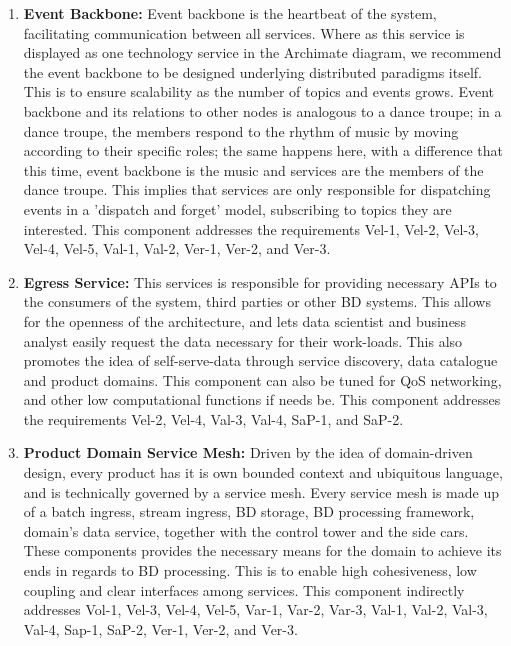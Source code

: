 \documentclass[conference]{IEEEtran}
\begin{document}
\begin{enumerate}
    \item \textbf{Event Backbone:} Event backbone is the heartbeat of the system, facilitating communication between all services. Where as this service is displayed as one technology service in the Archimate diagram, we recommend the event backbone to be designed underlying distributed paradigms itself. This is to ensure scalability as the number of topics and events grows. Event backbone and its relations to other nodes is analogous to a dance troupe; in a dance troupe, the members respond to the rhythm of music by moving according to their specific roles; the same happens here, with a difference that this time, event backbone is the music and services are the members of the dance troupe. This implies that services are only responsible for dispatching events in a 'dispatch and forget' model, subscribing to topics they are interested. This component addresses the requirements Vel-1, Vel-2, Vel-3, Vel-4, Vel-5, Val-1, Val-2, Ver-1, Ver-2, and Ver-3.
    
    \item \textbf{Egress Service:} This services is responsible for providing necessary APIs to the consumers of the system, third parties or other BD systems. This allows for the openness of the architecture, and lets data scientist and business analyst easily request the data necessary for their work-loads. This also promotes the idea of self-serve-data through service discovery, data catalogue and product domains. This component can also be tuned for QoS networking, and other low computational functions if needs be. This component addresses the requirements Vel-2, Vel-4, Val-3, Val-4, SaP-1, and SaP-2. 
    
    \item \textbf{Product Domain Service Mesh:} Driven by the idea of domain-driven design, every product has it is own bounded context and ubiquitous language, and is technically governed by a service mesh. Every service mesh is made up of a batch ingress, stream ingress, BD storage, BD processing framework, domain's data service, together with the control tower and the side cars. These components provides the necessary means for the domain to achieve its ends in regards to BD processing. This is to enable high cohesiveness, low coupling and clear interfaces among services. This component indirectly addresses Vol-1, Vel-3, Vel-4, Vel-5, Var-1, Var-2, Var-3, Val-1, Val-2, Val-3, Val-4, Sap-1, SaP-2, Ver-1, Ver-2, and Ver-3.
    

\end{enumerate}
\end{document}
